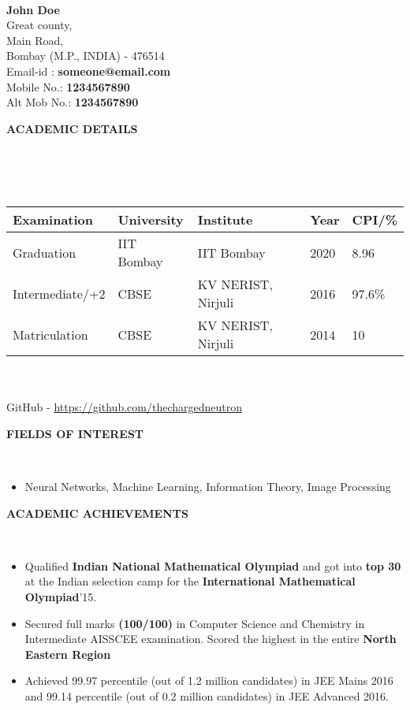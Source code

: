 \documentclass[a4paper,10pt]{article}
\newcommand{\lsep}{-0.5cm}
\newcommand{\resheading}[1]{{\small \colorbox{mygrey}{\begin{minipage}{0.975\textwidth}{\textbf{#1 \vphantom{p\^{E}}}}\end{minipage}}}}
\begin{document}
\hspace{0.5cm}\\[-0.2cm]

\textbf{John Doe} \\
\indent Great county, \\
\indent Main Road,  \\
\indent Bombay (M.P., INDIA) - 476514\\
\indent Email-id : \textbf{someone@email.com} \\
\indent Mobile No.: \textbf{1234567890} \\
\indent Alt Mob No.: \textbf{1234567890} \\

\resheading{\textbf{ACADEMIC DETAILS} }\\[\lsep]
\\ \\
\indent \begin{tabular}{ l @{\hskip 0.5in} l @{\hskip 0.6in} l @{\hskip 0.75in} l @{\hskip 1in} l }
\hline
\textbf{Examination} & \textbf{University} & \textbf{Institute } & \textbf{Year} & \textbf{CPI/\%} \\
\hline
Graduation      & IIT Bombay & IIT Bombay & 2020 & 8.96 \\
Intermediate/+2 & CBSE & KV NERIST, Nirjuli   & 2016 & 97.6\%\\
Matriculation & CBSE & KV NERIST, Nirjuli & 2014 & 10\\
\hline
\end{tabular}
\\ \\
\indent \indent GitHub - \href{https://github.com/thechargedneutron}{https://github.com/thechargedneutron}
\\

\resheading{\textbf{FIELDS OF INTEREST} }\\[\lsep]
\begin{itemize}
\item \noindent Neural Networks, Machine Learning, Information Theory, Image Processing
\end{itemize}

\resheading{\textbf{ACADEMIC ACHIEVEMENTS} }\\[\lsep]
\begin{itemize}
\setlength\itemsep{0.05em}
\item \noindent Qualified \textbf{Indian National Mathematical Olympiad} and got into \textbf{top 30} at the Indian selection camp for the \textbf{International Mathematical Olympiad}'15.
\item \noindent Secured full marks \textbf{(100/100)} in Computer Science and Chemistry in Intermediate AISSCEE examination. Scored the highest in the entire \textbf{North Eastern Region}
\item \noindent Achieved 99.97 percentile (out of 1.2 million candidates) in JEE Mains 2016 and 99.14 percentile (out of 0.2 million candidates) in JEE Advanced 2016.
\end{itemize}
\end{document}
